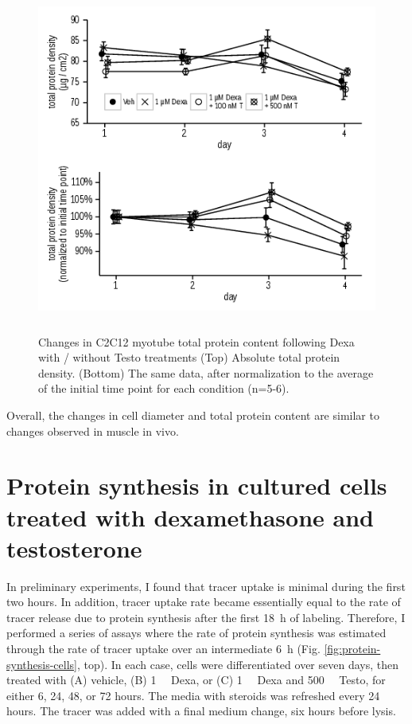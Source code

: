 \documentclass[12pt,english]{report}\usepackage[]{graphicx}\usepackage[]{color}
\newenvironment{knitrout}{}{} %
\begin{document}
\begin{figure}
\begin{knitrout}
\color{fgcolor}
\includegraphics[width=5in,height=4.5in]{figure/totalprotein-1} 

\end{knitrout}

\protect\caption[Changes in C2C12 myotube protein content following Dexa with / without
Testo treatments.]{Changes in C2C12 myotube total protein content following Dexa with
/ without Testo treatments (Top) Absolute total protein density. (Bottom)
The same data, after normalization to the average of the initial time
point for each condition (n=5-6).\label{fig:protein-mass-cells}}
\end{figure}


Overall, the changes in cell diameter and total protein content are
similar to changes observed in muscle in vivo.


\section{Protein synthesis in cultured cells treated with dexamethasone and
testosterone}

In preliminary experiments, I found that tracer uptake is minimal
during the first two hours. In addition, tracer uptake rate became
essentially equal to the rate of tracer release due to protein synthesis
after the first \SI{18}{\hour} of labeling. Therefore, I performed
a series of assays where the rate of protein synthesis was estimated
through the rate of tracer uptake over an intermediate \SI{6}{\hour}
(Fig. \ref{fig:protein-synthesis-cells}, top). In each case, cells
were differentiated over seven days, then treated with (A) vehicle,
(B) \SI{1}{\micro\molar} Dexa, or (C) \SI{1}{\micro\molar} Dexa
and \SI{500}{\nano\molar} Testo, for either 6, 24, 48, or 72 hours.
The media with steroids was refreshed every 24 hours. The tracer was
added with a final medium change, six hours before lysis.
\end{document}
